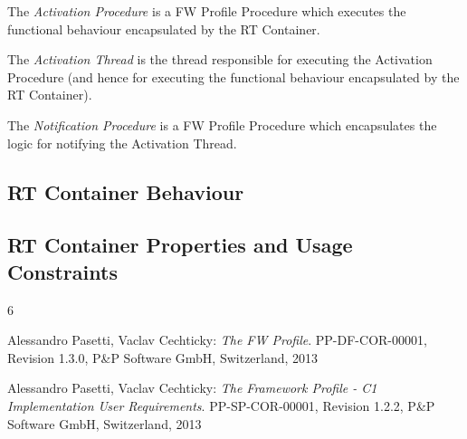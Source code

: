 \documentclass[manual]{../fwprofile}
\begin{document}
The \emph{Activation Procedure} is a FW Profile Procedure which executes the functional behaviour encapsulated by the RT Container.

The \emph{Activation Thread} is the thread responsible for executing the Activation Procedure (and hence for executing the functional behaviour encapsulated by the RT Container).

The \emph{Notification Procedure} is a FW Profile Procedure which encapsulates the logic for notifying the Activation Thread.

\subsection{RT Container Behaviour}\label{sec:rtContainersBehaviour}


\subsection{RT Container Properties and Usage Constraints}\label{sec:rtPropUsage}


\newpage

\begin{thebibliography}{6}
 
 Alessandro Pasetti, Vaclav Cechticky:
           {\sl The FW Profile}. PP-DF-COR-00001, Revision 1.3.0,
           P\&P Software GmbH, Switzerland, 2013 

 Alessandro Pasetti, Vaclav Cechticky:
           {\sl The Framework Profile - C1 Implementation User Requirements}. 
           PP-SP-COR-00001, Revision 1.2.2,
           P\&P Software GmbH, Switzerland, 2013 

\end{thebibliography}
\end{document}
